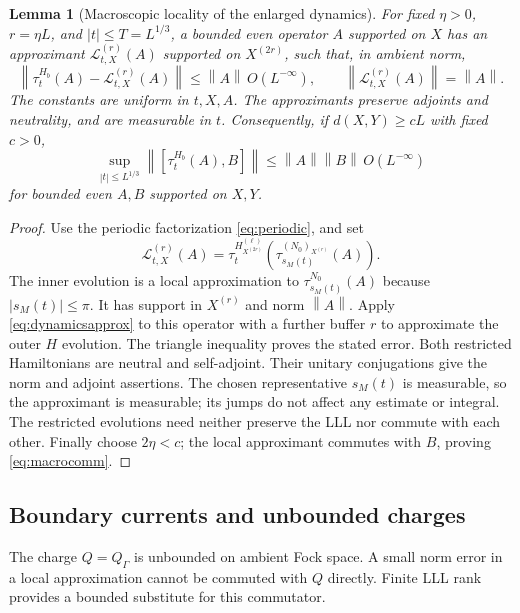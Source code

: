 \documentclass[11pt]{article}
\newtheorem{lemma}[theorem]{Lemma}
\theoremstyle{definition}
\theoremstyle{remark}
\newcommand{\norm}[1]{\left\lVert#1\right\rVert}
\newcommand{\abs}[1]{\left|#1\right|}
\begin{document}
\begin{lemma}[Macroscopic locality of the enlarged dynamics]\label{lem:macro}
For fixed \(\eta>0\), \(r=\eta L\), and \(\abs t\le T=L^{1/3}\),
a bounded even operator \(A\) supported on \(X\) has an
approximant \(\mathcal L_{t,X}^{(r)}(A)\) supported on \(X^{(2r)}\),
such that, in ambient norm,
\[
 \norm{\tau_t^{H_b}(A)-\mathcal L_{t,X}^{(r)}(A)}
 \le\norm A\,O(L^{-\infty}),\qquad
 \norm{\mathcal L_{t,X}^{(r)}(A)}=\norm A.
\]
The constants are uniform in \(t,X,A\).  The approximants
preserve adjoints and neutrality, and are measurable in \(t\).
Consequently, if \(d(X,Y)\ge cL\) with fixed \(c>0\),
\begin{equation}\label{eq:macrocomm}
 \sup_{\abs t\le L^{1/3}}
 \norm{[\tau_t^{H_b}(A),B]}
 \le\norm A\norm B\,O(L^{-\infty})
\end{equation}
for bounded even \(A,B\) supported on \(X,Y\).
\end{lemma}
\begin{proof}
Use the periodic factorization \eqref{eq:periodic}, and set
\[
 \mathcal L_{t,X}^{(r)}(A)=
 \tau_t^{H_{X^{(2r)}}^{(\ell)}}
 \left(\tau_{s_M(t)}^{(N_0)_{X^{(r)}}}(A)\right).
\]
The inner evolution is a local approximation to
\(\tau_{s_M(t)}^{N_0}(A)\) because \(\abs{s_M(t)}\le\pi\).
It has support in \(X^{(r)}\) and norm \(\norm A\).
Apply \eqref{eq:dynamicsapprox} to this operator with a
further buffer \(r\) to approximate the outer \(H\) evolution.
The triangle inequality proves the stated error.  Both restricted
Hamiltonians are neutral and self-adjoint.  Their unitary
conjugations give the norm and adjoint assertions.  The chosen
representative \(s_M(t)\) is measurable, so the approximant is
measurable; its jumps do not affect any estimate or integral.
The restricted evolutions need neither preserve the LLL nor
commute with each other.  Finally choose \(2\eta<c\);
the local approximant commutes with \(B\), proving
\eqref{eq:macrocomm}.
\end{proof}

\subsection{Boundary currents and unbounded charges}

The charge \(Q=Q_\Gamma\) is unbounded on ambient Fock space.
A small norm error in a local approximation cannot be commuted
with \(Q\) directly.  Finite LLL rank provides a bounded substitute
for this commutator.
\end{document}
